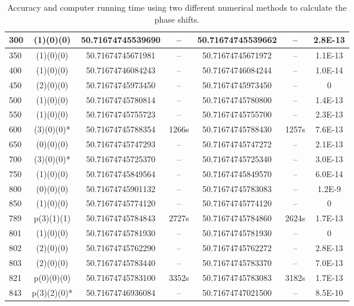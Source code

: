 \begin{flushleft}
\begin{table}
\begin{tabular}{|l|c|c|c|c|c|c|}
\hline
300         &(1)(0)(0) &   50.71674745539690 &     --     & 50.71674745539662    &     --      & 2.8E-13      \\
\hline
350         &(1)(0)(0) &   50.71674745671981 &     --     & 50.71674745671972    &     --      & 1.1E-13        \\
\hline
400         &(1)(0)(0) &   50.71674746084243 &     --     & 50.71674746084244    &     --      & 1.0E-14      \\
\hline
450         &(2)(0)(0) &   50.71674745973450 &     --     & 50.71674745973450    &     --      & 0        \\
\hline
500         &(1)(0)(0) &   50.71674745780814 &     --     & 50.71674745780800    &     --      & 1.4E-13      \\
\hline
550         &(1)(0)(0) &   50.71674745755723 &     --     & 50.71674745755700    &     --      & 2.3E-13        \\
\hline
600         &(3)(0)(0)*&   50.71674745788354 & 1266s      & 50.71674745788430    & 1257s       & 7.6E-13        \\ 
\hline
650         &(0)(0)(0) &   50.71674745747293 &     --     & 50.71674745747272    &     --      & 2.1E-13      \\
\hline
700         &(3)(0)(0)*&   50.71674745725370 &     --     & 50.71674745725340    &     --      & 3.0E-13     \\
\hline
750         &(1)(0)(0) &   50.71674745849564 &     --     & 50.71674745849570    &     --      & 6.0E-14    \\
\hline
800         &(0)(0)(0) &   50.71674745901132 &     --     & 50.71674745783083    &     --      & 1.2E-9      \\
\hline
850         &(1)(0)(0) &   50.71674745774120 &     --     & 50.71674745774120    &     --      & 0      \\
\hline
\hline
789         &p(3)(1)(1)&  50.71674745784843 &   2727s     & 50.71674745784860    & 2624s       & 1.7E-13      \\
\hline
801         &(1)(0)(0) &  50.71674745781930 &      --     & 50.71674745781930    &     --      & 0      \\
\hline
802         &(2)(0)(0) &  50.71674745762290 &      --     & 50.71674745762272    &     --      & 2.8E-13      \\
\hline
803         &(2)(0)(0) &  50.71674745783440 &      --     & 50.71674745783370    &     --      & 7.0E-13      \\
\hline
821         &p(0)(0)(0)&  50.71674745783100 &   3352s     & 50.71674745783083    &  3182s      & 1.7E-13      \\
\hline
843         &p(3)(2)(0)*& 50.71674746936084 &      --     & 50.71674747021500    &     --      & 8.5E-10      \\
\hline
\end{tabular}
\caption{
\label{tabKowalskysammenlikning}
Accuracy and computer running time using two different numerical methods to calculate the phase shifts.
}
\end{table}
\end{flushleft}
